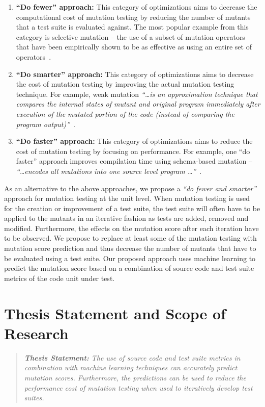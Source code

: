 \begin{enumerate}
  \item \textbf{``Do fewer'' approach:} This category of optimizations aims to decrease the computational cost of mutation testing by reducing the number of mutants that a test suite is evaluated against. The most popular example from this category is selective mutation -- the use of a subset of mutation operators that have been empirically shown to be as effective as using an entire set of operators~\cite{OLR+96}.

  \item \textbf{``Do smarter'' approach:} This category of optimizations aims to decrease the cost of mutation testing by improving the actual mutation testing technique. For example, weak mutation \emph{``\ldots is an approximation technique that compares the internal states of mutant and original program immediately after execution of the mutated portion of the code (instead of comparing the program output)''}~\cite{OU01}.

  \item \textbf{``Do faster'' approach:} This category of optimizations aims to reduce the cost of mutation testing by focusing on performance. For example, one ``do faster'' approach improves compilation time using schema-based mutation -- \emph{``\ldots encodes all mutations into one source level program \ldots''}~\cite{OU01}.
\end{enumerate}

As an alternative to the above approaches, we propose a \emph{``do fewer and smarter''} approach for mutation testing at the unit level. When mutation testing is used for the creation or improvement of a test suite, the test suite will often have to be applied to the mutants in an iterative fashion as tests are added, removed and modified. Furthermore, the effects on the mutation score after each iteration have to be observed. We propose to replace at least some of the mutation testing with mutation score prediction and thus decrease the number of mutants that have to be evaluated using a test suite. Our proposed approach uses machine learning to predict the mutation score based on a combination of source code and test suite metrics of the code unit under test.


\section{Thesis Statement and Scope of Research}
\label{sec:introduction_statement_and_scope}
\begin{quote}
  \emph{\textbf{Thesis Statement:} The use of source code and test suite metrics in combination with machine learning techniques can accurately predict mutation scores. Furthermore, the predictions can be used to reduce the performance cost of mutation testing when used to iteratively develop test suites.}
\end{quote}

